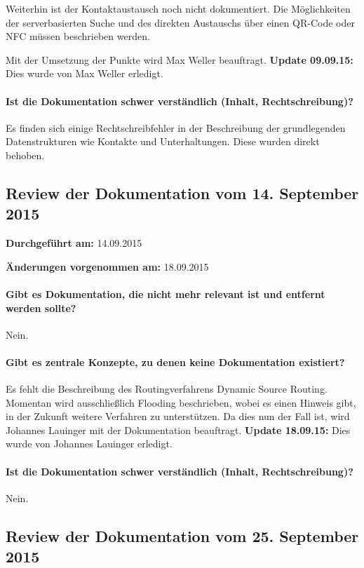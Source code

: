 Weiterhin ist der Kontaktaustausch noch nicht dokumentiert. Die Möglichkeiten der serverbasierten Suche und des direkten Austauschs über einen QR-Code oder NFC müssen beschrieben werden.

Mit der Umsetzung der Punkte wird Max Weller beauftragt. \textbf{Update 09.09.15:} Dies wurde von Max Weller erledigt.

\paragraph{Ist die Dokumentation schwer verständlich (Inhalt, Rechtschreibung)?}
Es finden sich einige Rechtschreibfehler in der Beschreibung der grundlegenden Datenstrukturen wie Kontakte und Unterhaltungen. Diese wurden direkt behoben.


\subsection{Review der Dokumentation vom 14. September 2015}

\textbf{Durchgeführt am:} 14.09.2015

\textbf{Änderungen vorgenommen am:} 18.09.2015

\paragraph{Gibt es Dokumentation, die nicht mehr relevant ist und entfernt werden sollte?}
Nein.

\paragraph{Gibt es zentrale Konzepte, zu denen keine Dokumentation existiert?}
Es fehlt die Beschreibung des Routingverfahrens Dynamic Source Routing. Momentan wird ausschließlich Flooding beschrieben, wobei es einen Hinweis gibt, in der Zukunft weitere Verfahren zu unterstützen. Da dies nun der Fall ist, wird Johannes Lauinger mit der Dokumentation beauftragt. \textbf{Update 18.09.15:} Dies wurde von Johannes Lauinger erledigt.

\paragraph{Ist die Dokumentation schwer verständlich (Inhalt, Rechtschreibung)?}
Nein.


\subsection{Review der Dokumentation vom 25. September 2015}


